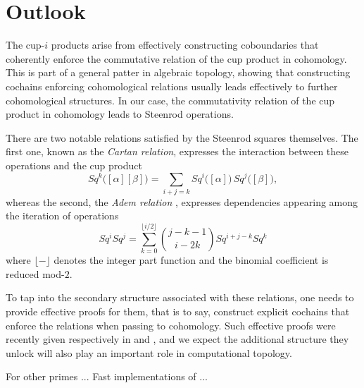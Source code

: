 
\section{Outlook}

The cup-$i$ products arise from effectively constructing coboundaries that coherently enforce the commutative relation of the cup product in cohomology.
This is part of a general patter in algebraic topology, showing that constructing cochains enforcing cohomological relations usually leads effectively to further cohomological structures.
In our case, the commutativity relation of the cup product in cohomology leads to Steenrod operations.

There are two notable relations satisfied by the Steenrod squares themselves.
The first one, known as the \textit{Cartan relation}, expresses the interaction between these operations and the cup product
\begin{equation*}
Sq^k \big( [\alpha] [\beta] \big) = \sum_{i+j=k} Sq^i \big([\alpha]\big)\, Sq^j \big([\beta]\big),
\end{equation*}
whereas the second, the \textit{Adem relation} \cite{adem52relations}, expresses dependencies appearing among the iteration of operations
\begin{equation} \label{equation: adem relations}
Sq^i Sq^j = \sum_{k=0}^{\lfloor i/2 \rfloor} {j-k-1 \choose i-2k} Sq^{i+j-k} Sq^k
\end{equation}
where $\lfloor- \rfloor$ denotes the integer part function and the binomial coefficient is reduced mod-$2$.

To tap into the secondary structure associated with these relations, one needs to provide effective proofs for them, that is to say, construct explicit cochains that enforce the relations when passing to cohomology.
Such effective proofs were recently given respectively in \cite{medina2020cartan} and \cite{medina2020adem}, and we expect the additional structure they unlock will also play an important role in computational topology.

For other primes ... Fast implementations of \cite{medina2020odd} ...